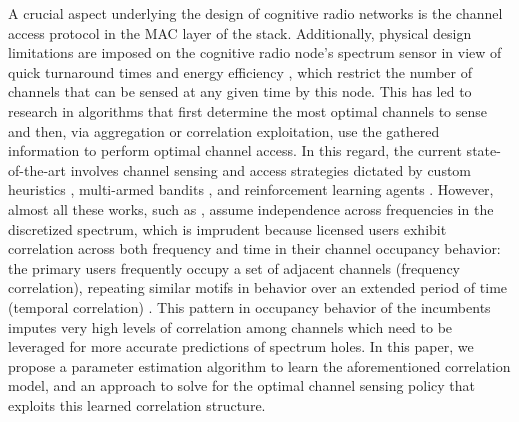 \documentclass[10pt,twocolumn]{IEEEtran}
\begin{document}
A crucial aspect underlying the design of cognitive radio networks is the channel access protocol in the MAC layer of the stack. Additionally, physical design limitations are imposed on the cognitive radio node's spectrum sensor in view of quick turnaround times and energy efficiency \cite{5990482}, which restrict the number of channels that can be sensed at any given time by this node. This has led to research in algorithms that first determine the most optimal channels to sense and then, via aggregation or correlation exploitation, use the gathered information to perform optimal channel access. In this regard, the current state-of-the-art involves channel sensing and access strategies dictated by custom heuristics \cite{4554696, 6956794}, multi-armed bandits \cite{7094730}, and reinforcement learning agents \cite{6507570}. However, almost all these works, such as \cite{7094730, 6507570}, assume independence across frequencies in the discretized spectrum, which is imprudent because licensed users exhibit correlation across both frequency and time in their channel occupancy behavior: the primary users frequently occupy a set of adjacent channels (frequency correlation), repeating similar motifs in behavior over an extended period of time (temporal correlation) \cite{6188346, 4213046,McHenry:2006:CSO:1234388.1234389}. This pattern in occupancy behavior of the incumbents imputes very high levels of correlation among channels which need to be leveraged for more accurate predictions of spectrum holes. In this paper, we propose a parameter estimation algorithm to learn the aforementioned correlation model, and an approach to solve for the optimal channel sensing policy that exploits this learned correlation structure.
\end{document}
